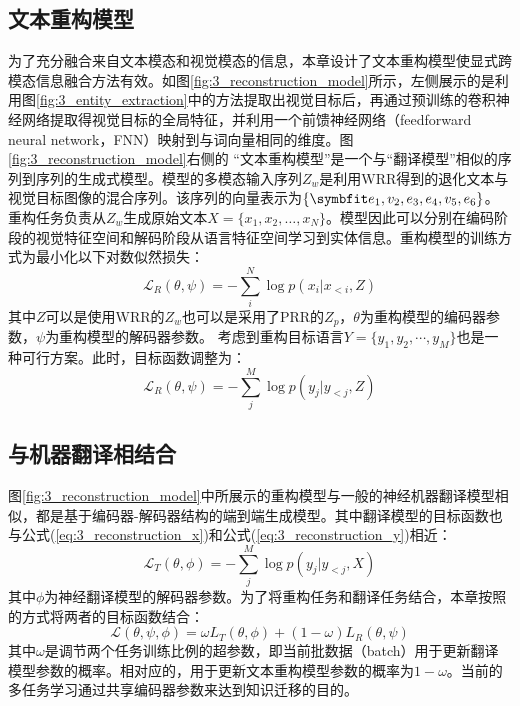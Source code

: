 \subsection{文本重构模型}
\label{sec:3_sentence_reconstruction}

为了充分融合来自文本模态和视觉模态的信息，本章设计了文本重构模型使显式跨模态信息融合方法有效。如图\ref{fig:3_reconstruction_model}所示，左侧展示的是利用图\ref{fig:3_entity_extraction}中的方法提取出视觉目标后，再通过预训练的卷积神经网络提取得视觉目标的全局特征，并利用一个前馈神经网络（feedforward neural network，FNN）映射到与词向量相同的维度。图\ref{fig:3_reconstruction_model}右侧的 “文本重构模型”是一个与“翻译模型”相似的序列到序列的生成式模型。模型的多模态输入序列$Z_{w}$是利用WRR得到的退化文本与视觉目标图像的混合序列。该序列的向量表示为$\{\Vector{e_1,v_2,e_3,e_4,v_5,e_6}\}$。重构任务负责从$Z_{w}$生成原始文本$X=\{x_1,x_2,…,x_N\}$。模型因此可以分别在编码阶段的视觉特征空间和解码阶段从语言特征空间学习到实体信息。重构模型的训练方式为最小化以下对数似然损失：
\begin{equation}
    \mathcal{L}_R(\theta, \psi)=-\sum_i^N \log p(x_i|x_{<i},Z)
    \label{eq:3_reconstruction_x}
\end{equation}
其中$Z$可以是使用WRR的$Z_{w}$也可以是采用了PRR的$Z_{p}$，$\theta$为重构模型的编码器参数，$\psi$为重构模型的解码器参数。
考虑到重构目标语言$Y=\{y_1,y_2,\cdots,y_M\}$也是一种可行方案。此时，目标函数调整为：
\begin{equation}
    \mathcal{L}_R(\theta, \psi)=-\sum_j^M \log p(y_j|y_{<j},Z)
    \label{eq:3_reconstruction_y}
\end{equation}

\subsection{与机器翻译相结合}
\label{sec:3_multitask}
图\ref{fig:3_reconstruction_model}中所展示的重构模型与一般的神经机器翻译模型相似，都是基于编码器-解码器结构的端到端生成模型。其中翻译模型的目标函数也与公式(\ref{eq:3_reconstruction_x})和公式(\ref{eq:3_reconstruction_y})相近：
\begin{equation}
    \mathcal{L}_T(\theta, \phi)=-\sum_j^M \log p(y_j|y_{<j},X)
    \label{eq:3_translation}
\end{equation}
其中$\phi$为神经翻译模型的解码器参数。为了将重构任务和翻译任务结合，本章按照的方式将两者的目标函数结合：
\begin{equation}
    \mathcal{L}(\theta, \psi, \phi)=\omega L_T(\theta, \phi) + (1-\omega)L_R(\theta, \psi)
    \label{eq:3_combine_sr}
\end{equation}
其中$\omega$是调节两个任务训练比例的超参数，即当前批数据（batch）用于更新翻译模型参数的概率。相对应的，用于更新文本重构模型参数的概率为$1-\omega$。当前的多任务学习通过共享编码器参数来达到知识迁移的目的。

